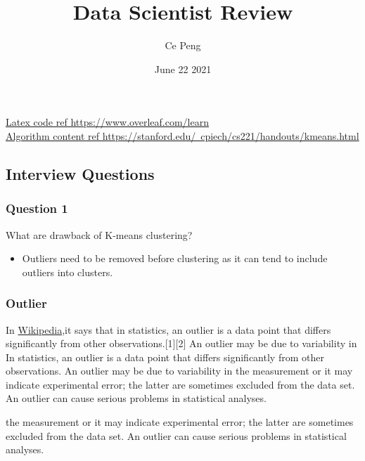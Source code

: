 \documentclass[10pt,letterpaper]{article}
\title{\textbf{Data Scientist Review}}
\author{Ce Peng}
\date{June 22 2021}
\begin{document}
\begin{titlepage}
\maketitle\maketitle
\begin{flushleft}
\href{https://www.overleaf.com/learn}{Latex code ref https://www.overleaf.com/learn} \\
\href{https://stanford.edu/~cpiech/cs221/handouts/kmeans.html}{Algorithm content ref https://stanford.edu/~cpiech/cs221/handouts/kmeans.html}
\end{flushleft}
\end{titlepage}

\subsection{Interview Questions}
\subsubsection{Question 1}
What are drawback of K-means clustering?
\begin{itemize}
\item Outliers need to be removed before clustering as it can tend to include outliers into clusters.
\end{itemize}

\subsubsection{Outlier}

In \href{https://en.wikipedia.org/wiki/Outlier#Identifying_outliers}{Wikipedia},it says that in statistics, an outlier is a data point that differs significantly from other observations.[1][2] An outlier may be due to variability in In statistics, an outlier is a data point that differs significantly from other observations. An outlier may be due to variability in the measurement or it may indicate experimental error; the latter are sometimes excluded from the data set. An outlier can cause serious problems in statistical analyses.

the measurement or it may indicate experimental error; the latter are sometimes excluded from the data set. An outlier can cause serious problems in statistical analyses.
\end{document}
